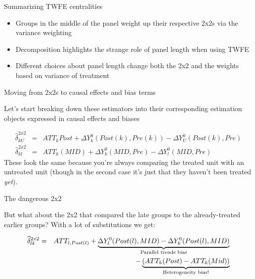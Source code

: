 \documentclass{beamer}
\begin{document}
\begin{frame}{Summarizing TWFE centralities}

\begin{itemize}
\item Groups in the middle of the panel weight up their respective 2x2s via the variance weighting
\item Decomposition highlights the strange role of panel length when using TWFE
\item Different choices about panel length change both the 2x2 and the weights based on variance of treatment
\end{itemize}

\end{frame}





\begin{frame}{Moving from 2x2s to causal effects and bias terms}

Let's start breaking down these estimators into their corresponding estimation objects expressed in causal effects and biases


\begin{eqnarray*}
\widehat{\delta}^{2x2}_{kU} &=& ATT_k{Post} + \Delta Y^0_k(Post(k),Pre(k)) - \Delta Y^0_U(Post(k),Pre) \\
\widehat{\delta}^{2x2}_{kl} &=& ATT_k(MID) + \Delta Y^0_k(MID,Pre) - \Delta Y^0_l(MID, Pre)
\end{eqnarray*}These look the same because you're always comparing the treated unit with an untreated unit (though in the second case it's just that they haven't been treated \emph{yet}). 

\end{frame}

\begin{frame}{The dangerous 2x2}

But what about the 2x2 that compared the late groups to the already-treated earlier groups? With a lot of substitutions we get:

\begin{eqnarray*}
\widehat{\delta}^{2x2}_{lk} &=& ATT_{l,Post(l)} + \underbrace{\Delta Y^0_l(Post(l),MID) - \Delta Y^0_k ( Post(l), MID)}_{\mathclap{\text{Parallel trends bias}}} \\
&& - \underbrace{(ATT_k(Post) - ATT_k(Mid))}_{\mathclap{\text{Heterogeneity bias!}}}
\end{eqnarray*}


\end{frame}
\end{document}
